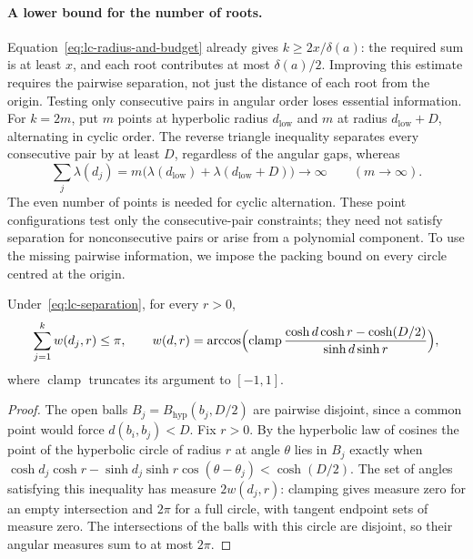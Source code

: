 \documentclass[11pt]{article}
\begin{document}
\paragraph{A lower bound for the number of roots.}
Equation~\eqref{eq:lc-radius-and-budget} already gives
$k\ge2x/\delta(a)$: the required sum is at least $x$, and each root
contributes at most $\delta(a)/2$. Improving this estimate requires the
pairwise separation, not just the distance of each root from the origin.
Testing only consecutive pairs in angular order loses essential information.
For $k=2m$, put $m$ points at hyperbolic radius $d_{\mathrm{low}}$ and
$m$ at radius $d_{\mathrm{low}}+D$, alternating in cyclic order. The
reverse triangle inequality separates every consecutive pair by at least
$D$, regardless of the angular gaps, whereas
\[
 \sum_j\lambda(d_j)
 =m\bigl(\lambda(d_{\mathrm{low}})+\lambda(d_{\mathrm{low}}+D)\bigr)
 \longrightarrow\infty\qquad(m\to\infty).
\]
The even number of points is needed for cyclic alternation. These point
configurations test only the consecutive-pair constraints; they need not
satisfy separation for nonconsecutive pairs or arise from a polynomial
component. To use the missing pairwise information, we impose the packing
bound on every circle centred at the origin.

\begin{lemma}\label{res:circle-slice-packing}
Under~\eqref{eq:lc-separation}, for every $r>0$,
\[
 \sum_{j=1}^{k}w(d_j,r)\le\pi,\qquad
 w(d,r)=\arccos\Bigl(\operatorname{clamp}
   \frac{\cosh d\cosh r-\cosh(D/2)}{\sinh d\sinh r}\Bigr),
\]
where $\operatorname{clamp}$ truncates its argument to $[-1,1]$.
\end{lemma}

\begin{proof}
The open balls $B_j=B_{\mathrm{hyp}}(b_j,D/2)$ are pairwise disjoint, since a
common point would force $d(b_i,b_j)<D$.  Fix $r>0$.  By the hyperbolic law of
cosines the point of the hyperbolic circle of radius $r$ at angle $\theta$
lies in $B_j$ exactly when
$\cosh d_j\cosh r-\sinh d_j\sinh r\cos(\theta-\theta_j)<\cosh(D/2)$.
The set of angles satisfying this inequality has measure $2w(d_j,r)$:
clamping gives measure zero for an empty intersection and $2\pi$ for a
full circle, with tangent endpoint sets of measure zero. The intersections
of the balls with this circle are disjoint, so their angular measures
sum to at most $2\pi$.
\end{proof}
\end{document}
